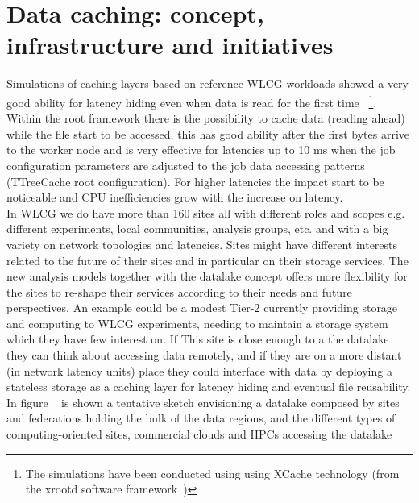 \section{Data caching: concept, infrastructure and initiatives}
Simulations of caching layers based on reference WLCG workloads showed a very good ability for latency hiding even when data is read for the first time ~\footnote{The simulations have been conducted using using XCache technology (from the xrootd software framework~\cite{xroot})}.
Within the root framework \cite{root} there is the possibility to cache data (reading ahead) while the file start to be accessed, this has good ability after the first bytes arrive to the worker node and is very effective for latencies up to 10 ms when the job configuration parameters are adjusted to the job data accessing patterns (TTreeCache root configuration). For higher latencies the impact start to be noticeable and CPU inefficiencies grow with the increase on latency.\\
In WLCG we do have more than 160 sites all with different roles and scopes e.g. different experiments, local communities, analysis groups, etc. and with a big variety on network topologies and latencies. Sites might have different interests related to the future of their sites and in particular on their storage services. The new analysis models together with the datalake concept offers more flexibility for the sites to re-shape their services according to their needs and future perspectives. An example could be a modest Tier-2 currently providing storage and computing to WLCG experiments, needing to maintain a storage system which they have few interest on. If This site is close enough to a the datalake they can think about accessing data remotely, and if they are on a more distant (in network latency units) place they could interface with data by deploying a stateless storage as a caching layer for latency hiding and eventual file reusability. In figure ~ is shown a tentative sketch envisioning a datalake composed by sites and federations holding the bulk of the data regions, and the different types of computing-oriented sites, commercial clouds and HPCs accessing the datalake\\

